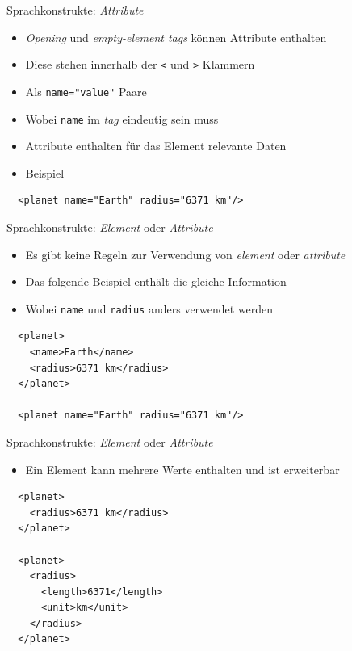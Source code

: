 \documentclass{beamer}
\begin{document}
\begin{frame}[fragile]{Sprachkonstrukte: \emph{Attribute}}
	
	\begin{itemize}
		\item \emph{Opening} und \emph{empty-element tags} können Attribute enthalten
		\item Diese stehen innerhalb der \texttt{<} und \texttt{>} Klammern
		\item Als \texttt{name="value"} Paare 
		\item Wobei \texttt{name} im \emph{tag} eindeutig sein muss
		\item Attribute enthalten für das Element relevante Daten
		\item Beispiel
	\end{itemize}
	
	\begin{lstlisting}
  <planet name="Earth" radius="6371 km"/>
	\end{lstlisting}
	
\end{frame}

\begin{frame}[fragile]{Sprachkonstrukte: \emph{Element} oder \emph{Attribute}}
	
	\begin{itemize}
		\item Es gibt keine Regeln zur Verwendung von \emph{element} oder \emph{attribute}
		\item Das folgende Beispiel enthält die gleiche Information
		\item Wobei \texttt{name} und \texttt{radius} anders verwendet werden
	\end{itemize}
	
	\begin{lstlisting}
  <planet>
    <name>Earth</name>
    <radius>6371 km</radius>
  </planet>
	
  <planet name="Earth" radius="6371 km"/>
	\end{lstlisting}
	
\end{frame}

\begin{frame}[fragile]{Sprachkonstrukte: \emph{Element} oder \emph{Attribute}}
	
	\begin{itemize}
		\item Ein Element kann mehrere Werte enthalten und ist erweiterbar 
	\end{itemize}
	
	\begin{lstlisting}
  <planet>
    <radius>6371 km</radius>
  </planet>
	
  <planet>
    <radius>
      <length>6371</length>
      <unit>km</unit>
    </radius>
  </planet>
	\end{lstlisting}
	
\end{frame}
\end{document}
